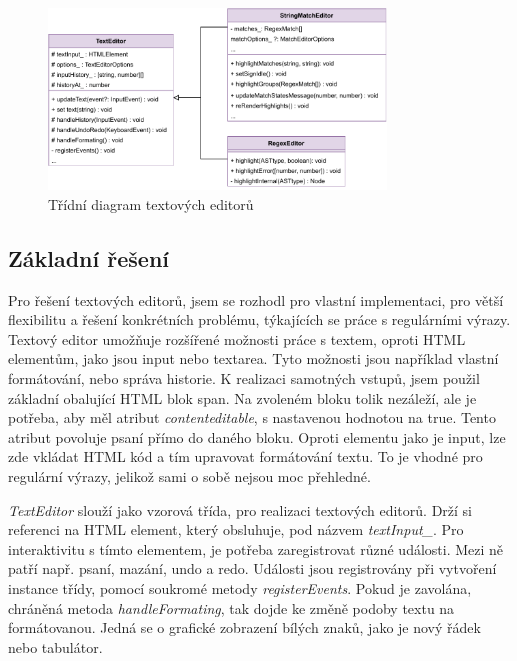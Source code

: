\begin{figure}[!h]
	\centering
	\includegraphics[width=0.8\textwidth]{Figures/TextEditor.pdf}
	\caption{Třídní diagram textových editorů}
	\label{fig:TextEditor}
\end{figure} 

\subsection*{Základní řešení}

Pro řešení textových editorů, jsem se rozhodl pro vlastní implementaci, pro větší flexibilitu a řešení konkrétních problému, týkajících se práce s regulárními výrazy.
Textový editor umožňuje rozšířené možnosti práce s textem, oproti HTML elementům, jako jsou input nebo textarea.
Tyto možnosti jsou například vlastní formátování, nebo správa historie. 
K realizaci samotných vstupů, jsem použil základní obalující HTML blok span.
Na zvoleném bloku tolik nezáleží, ale je potřeba, aby měl atribut \textit{contenteditable}, s nastavenou hodnotou na true.
Tento atribut povoluje psaní přímo do daného bloku. 
Oproti elementu jako je input, lze zde vkládat HTML kód a tím upravovat formátování textu.
To je vhodné pro regulární výrazy, jelikož sami o sobě nejsou moc přehledné.

\textit{TextEditor} slouží jako vzorová třída, pro realizaci textových editorů.
Drží si referenci na HTML element, který obsluhuje, pod názvem \textit{textInput\_}. 
Pro interaktivitu s tímto elementem, je potřeba zaregistrovat různé události.
Mezi ně patří např. psaní, mazání, undo a redo. 
Události jsou registrovány při vytvoření instance třídy, pomocí soukromé metody \textit{registerEvents}.
Pokud je zavolána, chráněná metoda \textit{handleFormating}, tak dojde ke změně podoby textu na formátovanou.
Jedná se o grafické zobrazení bílých znaků, jako je nový řádek nebo tabulátor.


